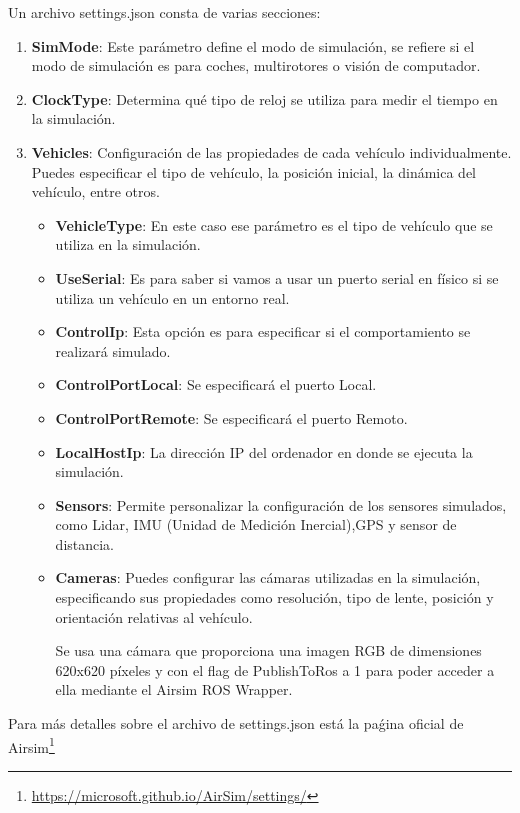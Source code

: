 Un archivo settings.json consta de varias secciones: 
\begin{enumerate}
  \item \textbf{SimMode}: Este parámetro define el modo de simulación, se refiere si el modo de simulación es para coches, multirotores o visión de computador.
  \item \textbf{ClockType}: Determina qué tipo de reloj se utiliza para medir el tiempo en la simulación. 
  \item \textbf{Vehicles}: Configuración de  las propiedades de cada vehículo individualmente. Puedes especificar el tipo de vehículo, la posición inicial, la dinámica del vehículo, entre otros.
  \begin{itemize}
    \item \textbf{VehicleType}: En este caso ese parámetro es el tipo de vehículo que se utiliza en la simulación.
    \item \textbf{UseSerial}: Es para saber si vamos a usar un puerto serial en físico si se utiliza un vehículo en un entorno real.
    \item \textbf{ControlIp}: Esta opción es para especificar si el comportamiento se realizará simulado.
    \item \textbf{ControlPortLocal}: Se especificará el puerto Local. 
    \item \textbf{ControlPortRemote}: Se especificará el puerto Remoto.
    \item \textbf{LocalHostIp}: La dirección IP del ordenador en donde se ejecuta la simulación.
    \item \textbf{Sensors}: Permite personalizar la configuración de los sensores simulados, como Lidar, IMU (Unidad de Medición Inercial),GPS y sensor de distancia. 
    \item \textbf{Cameras}: Puedes configurar las cámaras utilizadas en la simulación, especificando sus propiedades como resolución, tipo de lente, posición y orientación relativas al vehículo. 
    
    Se usa una cámara que proporciona una imagen RGB de dimensiones 620x620 píxeles y con
    el flag de PublishToRos a 1 para poder acceder a ella mediante el Airsim ROS Wrapper.
  \end{itemize}
\end{enumerate}

Para más detalles sobre el archivo de settings.json está la paǵina oficial de Airsim\footnote{\url{https://microsoft.github.io/AirSim/settings/}} 

